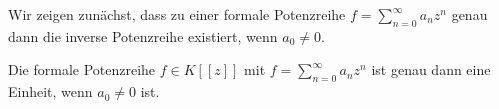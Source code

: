 %
%
%
%
%
%
%
Wir zeigen zunächst, dass zu einer formale Potenzreihe $f = \sum_{n=0}^\infty a_n z^n$ genau dann die inverse Potenzreihe existiert, wenn $a_0 \neq 0 $.
%
%
%
\begin{satz}\label{potenzreihenringEinheit}
Die formale Potenzreihe $f \in K[[z]] $ mit $f = \sum\limits_{n=0}^{\infty}a_nz^n $ ist genau dann eine Einheit, wenn $a_0 \neq 0$ ist.\\ 
\end{satz}
